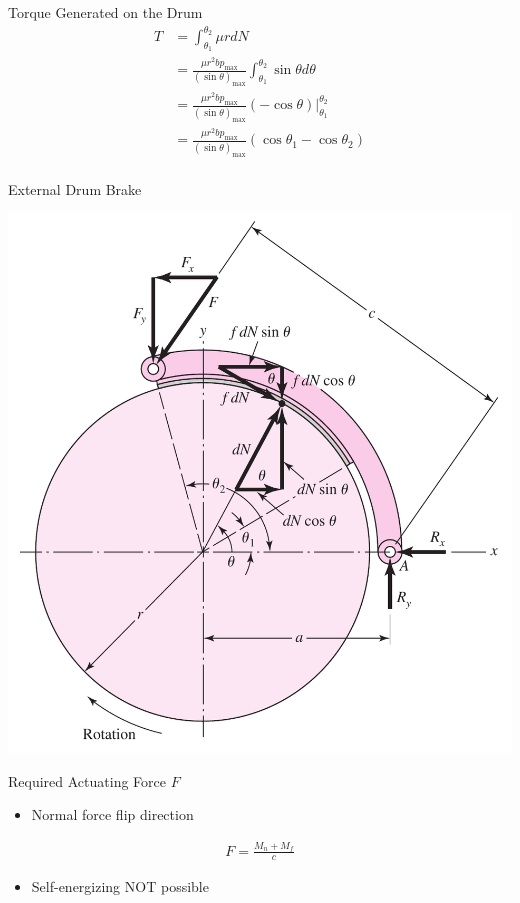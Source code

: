 \documentclass[10pt, svgnames]{beamer}
\begin{document}
\begin{frame}[label={sec:org3b77192}]{Torque Generated on the Drum}
\begin{align*}
    T &= \int_{\theta_1}^{\theta_2} \mu r dN \\
        &= \frac{\mu r^2 bp_{\max}}{(\sin \theta)_{\max}} \int_{\theta_1}^{\theta_2} \sin \theta d\theta \\
        &= \frac{\mu r^2 bp_{\max}}{(\sin \theta)_{\max}} (-\cos \theta)|_{\theta_1}^{\theta_2} \\
        &= \frac{\mu r^2 bp_{\max}}{(\sin \theta)_{\max}} (\cos \theta_1 - \cos \theta_2) \\
\end{align*}
\end{frame}

\begin{frame}[label={sec:orgb019ca5}]{External Drum Brake}
\begin{center}
\includegraphics[height=0.9\textheight]{./pictures/external-drum-brake.png}
\end{center}
\end{frame}

\begin{frame}[label={sec:org275e675}]{Required Actuating Force \(F\)}
\begin{itemize}
\item Normal force flip direction
\end{itemize}

\begin{align*}
    F = \frac{M_{n} + M_{f}}{c}
\end{align*}

\begin{itemize}
\item Self-energizing \alert{NOT} possible
\end{itemize}
\end{frame}
\end{document}
